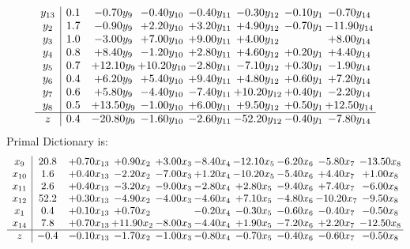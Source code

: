 \documentclass[9pt]{article}
\begin{document}
\[\begin{array}{c| c c@{\hskip 2pt} c@{\hskip 2pt} c@{\hskip 2pt} c@{\hskip 2pt} c@{\hskip 2pt} c@{\hskip 2pt} }
 y_{13}   &  0.1 & -0.70 y_{9} & -0.40 y_{10} & -0.40 y_{11} & -0.30 y_{12} & -0.10 y_{1} & -0.70 y_{14}\\
 y_{2}   &  1.7 & -0.90 y_{9} & +  2.20 y_{10} & +  3.20 y_{11} & +  4.90 y_{12} & -0.70 y_{1} & -11.90 y_{14}\\
 y_{3}   &  1.0 & -3.00 y_{9} & +  7.00 y_{10} & +  9.00 y_{11} & +  4.00 y_{12} &   & +  8.00 y_{14}\\
 y_{4}   &  0.8 & +  8.40 y_{9} & -1.20 y_{10} & +  2.80 y_{11} & +  4.60 y_{12} & +  0.20 y_{1} & +  4.40 y_{14}\\
 y_{5}   &  0.7 & + 12.10 y_{9} & + 10.20 y_{10} & -2.80 y_{11} & -7.10 y_{12} & +  0.30 y_{1} & -1.90 y_{14}\\
 y_{6}   &  0.4 & +  6.20 y_{9} & +  5.40 y_{10} & +  9.40 y_{11} & +  4.80 y_{12} & +  0.60 y_{1} & +  7.20 y_{14}\\
 y_{7}   &  0.6 & +  5.80 y_{9} & -4.40 y_{10} & -7.40 y_{11} & + 10.20 y_{12} & +  0.40 y_{1} & -2.20 y_{14}\\
 y_{8}   &  0.5 & + 13.50 y_{9} & -1.00 y_{10} & +  6.00 y_{11} & +  9.50 y_{12} & +  0.50 y_{1} & + 12.50 y_{14}\\
\hline
z    &  0.4 & -20.80 y_{9} & -1.60 y_{10} & -2.60 y_{11} & -52.20 y_{12} & -0.40 y_{1} & -7.80 y_{14}\\
\end{array}\]
Primal Dictionary is:
\[\begin{array}{c| c c@{\hskip 2pt} c@{\hskip 2pt} c@{\hskip 2pt} c@{\hskip 2pt} c@{\hskip 2pt} c@{\hskip 2pt} c@{\hskip 2pt} c@{\hskip 2pt} }
 x_{9}   &  20.8 & +  0.70 x_{13} & +  0.90 x_{2} & +  3.00 x_{3} & -8.40 x_{4} & -12.10 x_{5} & -6.20 x_{6} & -5.80 x_{7} & -13.50 x_{8}\\
 x_{10}   &  1.6 & +  0.40 x_{13} & -2.20 x_{2} & -7.00 x_{3} & +  1.20 x_{4} & -10.20 x_{5} & -5.40 x_{6} & +  4.40 x_{7} & +  1.00 x_{8}\\
 x_{11}   &  2.6 & +  0.40 x_{13} & -3.20 x_{2} & -9.00 x_{3} & -2.80 x_{4} & +  2.80 x_{5} & -9.40 x_{6} & +  7.40 x_{7} & -6.00 x_{8}\\
 x_{12}   &  52.2 & +  0.30 x_{13} & -4.90 x_{2} & -4.00 x_{3} & -4.60 x_{4} & +  7.10 x_{5} & -4.80 x_{6} & -10.20 x_{7} & -9.50 x_{8}\\
 x_{1}   &  0.4 & +  0.10 x_{13} & +  0.70 x_{2} &   & -0.20 x_{4} & -0.30 x_{5} & -0.60 x_{6} & -0.40 x_{7} & -0.50 x_{8}\\
 x_{14}   &  7.8 & +  0.70 x_{13} & + 11.90 x_{2} & -8.00 x_{3} & -4.40 x_{4} & +  1.90 x_{5} & -7.20 x_{6} & +  2.20 x_{7} & -12.50 x_{8}\\
\hline
z    &  -0.4 & -0.10 x_{13} & -1.70 x_{2} & -1.00 x_{3} & -0.80 x_{4} & -0.70 x_{5} & -0.40 x_{6} & -0.60 x_{7} & -0.50 x_{8}\\
\end{array}\]
\end{document}
